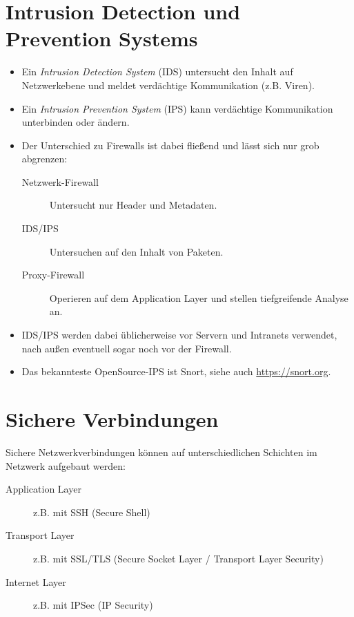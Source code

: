 \documentclass[a4paper, 11pt, accentcolor = tud3b]{tudreport}
\newcommand{\HREF}[1]{\href{#1}{#1}}
\begin{document}
        \section{Intrusion Detection und Prevention Systems}
            \begin{itemize}
            	\item Ein \textit{Intrusion Detection System} (IDS) untersucht den Inhalt auf Netzwerkebene und meldet verdächtige Kommunikation (z.B. Viren).
            	\item Ein \textit{Intrusion Prevention System} (IPS) kann verdächtige Kommunikation unterbinden oder ändern.
            	\item Der Unterschied zu Firewalls ist dabei fließend und lässt sich nur grob abgrenzen:
	            	\begin{description}
	            		\item[Netzwerk-Firewall] Untersucht nur Header und Metadaten.
	            		\item[IDS/IPS] Untersuchen auf den Inhalt von Paketen.
	            		\item[Proxy-Firewall] Operieren auf dem Application Layer und stellen tiefgreifende Analyse an.
	            	\end{description}
            	\item IDS/IPS werden dabei üblicherweise vor Servern und Intranets verwendet, nach außen eventuell sogar noch vor der Firewall.
            	\item Das bekannteste OpenSource-IPS ist Snort, siehe auch \HREF{https://snort.org}.
            \end{itemize}

        \section{Sichere Verbindungen}
            Sichere Netzwerkverbindungen können auf unterschiedlichen Schichten im Netzwerk aufgebaut werden:
            \begin{description}
            	\item[Application Layer] z.B. mit SSH (Secure Shell)
            	\item[Transport Layer] z.B. mit SSL/TLS (Secure Socket Layer / Transport Layer Security)
            	\item[Internet Layer] z.B. mit IPSec (IP Security)
            \end{description}
\end{document}

